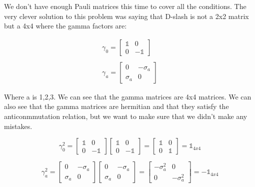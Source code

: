 We don't have enough Pauli matrices this time to cover all the conditions. The very clever solution to this problem was saying that D-slash is not a 2x2 matrix but a 4x4 where the gamma factors are:

\begin{equation}
  \label{10.37}
\begin{array}{c}
  \gamma_0 = \begin{bmatrix}
    \mathbb{1} & 0\\
    0 & -\mathbb{1}
  \end{bmatrix}
  \\

  \\
  \gamma_a = \begin{bmatrix}
    0 & -\sigma_a\\
    \sigma_a & 0
  \end{bmatrix}
\end{array}
\end{equation}

Where a is 1,2,3. We can see that the gamma matrices are 4x4 matrices. We can also see that the gamma matrices are hermitian and that they satisfy the anticonmmutation relation, but we want to make sure that we didn't make any mistakes.

\begin{equation}
  \gamma_0^2 = \begin{bmatrix}
    \mathbb{1} & 0\\
    0 & -\mathbb{1}
  \end{bmatrix}\begin{bmatrix}
    \mathbb{1} & 0\\
    0 & -\mathbb{1}
  \end{bmatrix} = \begin{bmatrix}
    \mathbb{1} & 0\\
    0 & \mathbb{1}
  \end{bmatrix} = \mathbb{1}_{4x4}
\end{equation}


\begin{equation}
  \gamma_a^2 = \begin{bmatrix}
    0 & -\sigma_a\\
    \sigma_a & 0
  \end{bmatrix}\begin{bmatrix}
    0 & -\sigma_a\\
    \sigma_a & 0
  \end{bmatrix} = \begin{bmatrix}
    -\sigma_a^2 & 0\\
    0 & -\sigma_a^2\end{bmatrix} = - \mathbb{1}_{4x4}
\end{equation}

